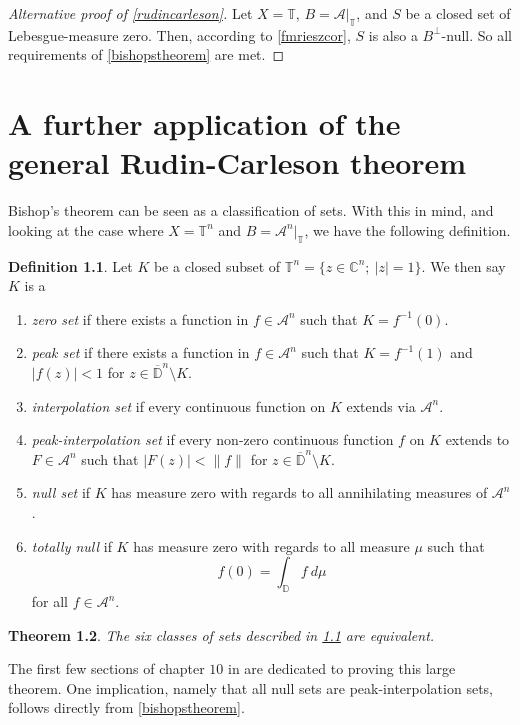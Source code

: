 \documentclass[a4paper,12pt,twoside,BCOR=10mm]{scrbook}
\newtheorem{theorem}{Theorem}[section]
\theoremstyle{definition}
\theoremstyle{definition}
\theoremstyle{definition}
\newtheorem{definition}[theorem]{Definition}
\begin{document}
\begin{proof}[Alternative proof of \ref{rudincarleson}]
Let
	$X = \mathbb{T}$,
	$B = \mathcal{A}|_{\mathbb{T}}$,
	and $S$ be a closed set of Lebesgue-measure zero. 
Then, according to \ref{fmrieszcor}, $S$ is also a $B^{\bot}$-null.
So all requirements of \ref{bishopstheorem} are met.
\end{proof}

\appendix
\renewcommand{\chaptername}{Appendix}
\chapter{A further application of the general Rudin-Carleson theorem}
\label{section4}
Bishop's theorem can be seen as a classification of sets.
With this in mind, and looking at the case where $X = \mathbb{T}^n$ and $B = \mathcal{A}^n|_{\mathbb{T}}$, we have the following definition.
\begin{definition}
\label{bigdef}
Let $K$ be a closed subset of $\mathbb{T}^n = \{z \in \mathbb{C}^n;\ |z| = 1\}$.
We then say $K$ is a
\begin{enumerate}
	\item \emph{zero set} if there exists a function in $f \in \mathcal{A}^n$ such that $K = f^{-1}(0)$.
	\item \emph{peak set} if there exists a function in $f \in \mathcal{A}^n$ such that $K = f^{-1}(1)$ and $|f(z)| < 1$ for $z \in \overline{\mathbb{D}}^n \setminus K$.
	\item \emph{interpolation set} if every continuous function on $K$ extends via $\mathcal{A}^n$. 
	\item \emph{peak-interpolation set} if every non-zero continuous function $f$ on $K$ extends to $F \in \mathcal{A}^n$ such that $|F(z)| < \|f\|$ for $z \in \overline{\mathbb{D}}^n \setminus K$.
	\item \emph{null set} if $K$ has measure zero with regards to all annihilating measures of $\mathcal{A}^n$.
	\item \emph{totally null} if $K$ has measure zero with regards to all measure $\mu$ such that
			\[
				f(0) = \int_{\mathbb{D}} f\ d\mu
			\]
			for all $f \in \mathcal{A}^n$.
\end{enumerate}
\end{definition}
\begin{theorem}
	The six classes of sets described in \ref{bigdef} are equivalent.
\end{theorem}
The first few sections of chapter $10$ in \citep{rudin3} are dedicated to proving this large theorem.
One implication, namely that all null sets are peak-interpolation sets, follows directly from \ref{bishopstheorem}.


\end{document}
